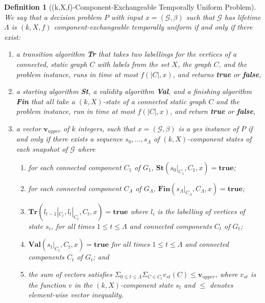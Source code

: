 \documentclass[10pt,a4paper]{amsart}
\newtheorem{definition}{Definition}
\begin{document}
\begin{definition}[(k,X,f)-Component-Exchangeable Temporally Uniform Problem] \label{def:kxf problem}
We say that a decision problem $P$ with input $x = (\mathcal{G},\beta)$ such that $\mathcal{G}$ has lifetime $\Lambda$ is \emph{$(k,X,f)$
component-exchangeable temporally uniform} if and only if there exist:
\begin{enumerate}
    \item a transition algorithm \textbf{Tr} that takes two labellings for the vertices of a connected, static graph $C$ with labels from the set $X$, the graph $C$, and the problem instance, runs in time
at most $f(|C|,x)$, and returns \textbf{true} or \textbf{false},
\item a starting algorithm \textbf{St}, a validity algorithm \textbf{Val}, and a finishing algorithm \textbf{Fin} that all
take a $(k,X)$-state of a connected static graph $C$ and the problem instance, run in time
at most $f(|C|,x)$, and return \textbf{true} or \textbf{false},
\item a vector $\textbf{v}_{upper}$ of $k$ integers, such that $x = (\mathcal{G},\beta)$ is a yes instance of $P$ if and only if there exists a sequence $s_0,...,s_{\Lambda}$ of
$(k,X)$-component states of each snapshot of $\mathcal{G}$ where
\begin{enumerate} 
    \item for each connected component $C_1$ of $G_1$, $\textbf{St}(s_0|_{C_1}, C_1,x) = \textbf{true}$;
\item for each connected component $C_\Lambda$ of $G_\Lambda$, $\textbf{Fin}(s_\Lambda |_{C_\Lambda},C_\Lambda,x) = \textbf{true}$;
\item $\textbf{Tr}(l_{t-1}|_{C_t},l_t|_{C_t},C_t,x) = \textbf{true}$ where $l_i$ is the labelling of vertices of state $s_i$, for all times $1 \leq t \leq \Lambda$ and connected components $C_t$ of $G_t$;
\item $\textbf{Val}(s_t|_{C_t},C_t,x) = \textbf{true}$ for all times $1 \leq t \leq \Lambda$ and connected components $C_t$ of $G_t$; and
\item the sum of vectors satisfies $\Sigma_{0\leq t\leq \Lambda} \Sigma_{C \in C_t} v_{st}(C) \leq \textbf{v}_{upper}$, where $v_{st}$ is the function $v$ in
the $(k,X)$-component state $s_t$ and $\leq$ denotes element-wise vector inequality.
\end{enumerate}
\end{enumerate}
\end{definition}
\end{document}
